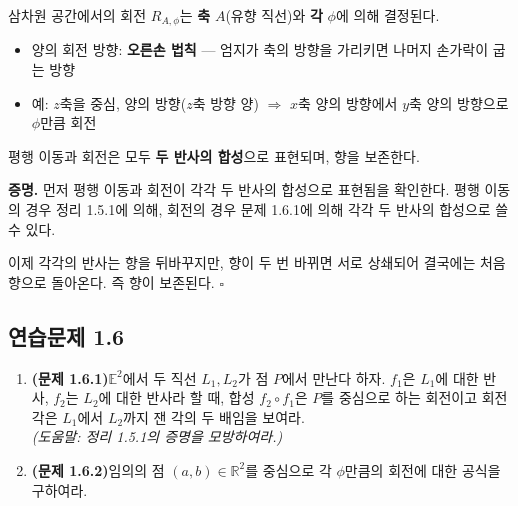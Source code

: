 \documentclass{article}
\begin{document}
\begin{tcolorbox}[
  colback=teal!4, colframe=teal!65!black,
  title=정의 (공간에서의 회전),
  fonttitle=\bfseries, boxrule=0.5mm, arc=3mm]

삼차원 공간에서의 회전 $R_{A,\phi}$는 \textbf{축} $A$(유향 직선)와 \textbf{각} $\phi$에 의해 결정된다.
\begin{itemize}\setlength\itemsep{0pt}
  \item 양의 회전 방향: \textbf{오른손 법칙} --- 엄지가 축의 방향을 가리키면 나머지 손가락이 굽는 방향
  \item 예: $z$축을 중심, 양의 방향($z$축 방향 양) $\Rightarrow$ $x$축 양의 방향에서 $y$축 양의 방향으로 $\phi$만큼 회전
\end{itemize}

\end{tcolorbox}

\begin{tcolorbox}[
  colback=red!4, colframe=red!60!black,
  title=정리: 평행 이동과 회전은 향(Orientation)을 보존,
  fonttitle=\bfseries, boxrule=0.5mm, arc=3mm]

평행 이동과 회전은 모두 \textbf{두 반사의 합성}으로 표현되며, 향을 보존한다.

\end{tcolorbox}

\textbf{증명.}\quad
먼저 평행 이동과 회전이 각각 두 반사의 합성으로 표현됨을 확인한다.
평행 이동의 경우 정리 1.5.1에 의해, 회전의 경우 문제 1.6.1에 의해 각각 두 반사의 합성으로 쓸 수 있다.

이제 각각의 반사는 향을 뒤바꾸지만,
향이 두 번 바뀌면 서로 상쇄되어 결국에는 처음 향으로 돌아온다.
즉 향이 보존된다.
\hfill $\square$

\subsection*{연습문제 1.6}

\begin{enumerate}
  \item \textbf{(문제 1.6.1)}\quad $\mathbb{E}^2$에서 두 직선 $L_1, L_2$가 점 $P$에서 만난다 하자.
    $f_1$은 $L_1$에 대한 반사, $f_2$는 $L_2$에 대한 반사라 할 때, 합성 $f_2 \circ f_1$은
    $P$를 중심으로 하는 회전이고 회전각은 $L_1$에서 $L_2$까지 잰 각의 두 배임을 보여라.\\
    \textit{(도움말: 정리 1.5.1의 증명을 모방하여라.)}

  \item \textbf{(문제 1.6.2)}\quad 임의의 점 $(a,b) \in \mathbb{R}^2$를 중심으로 각 $\phi$만큼의
    회전에 대한 공식을 구하여라.
\end{enumerate}
\end{document}

